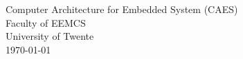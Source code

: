 \documentclass[a4paper, 11pt,oldfontcommands]{memoir}
\newlength\drop
\begin{document}
\begin{titlingpage}
  \begin{center}
    \vfill
    Computer Architecture for Embedded System (CAES)\\
    Faculty of EEMCS\\
    University of Twente\\
    \vspace{1cm}
    \today
  \end{center} 
\end{titlingpage}

\newcommand*{\pretoctitle}[1]{{\clearpage\centering
   \vspace*{-\topfiddle}#1\par}}

\frontmatter	  %


\cleardoublepage
\end{document}
